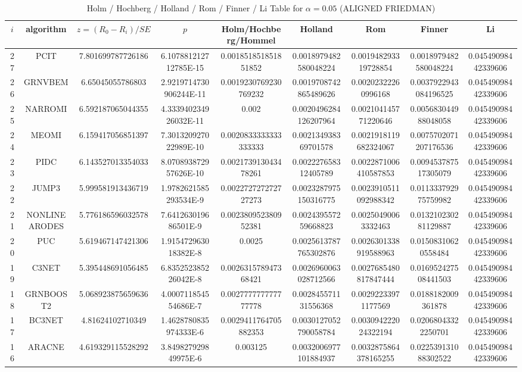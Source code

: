 \documentclass[a4paper,10pt]{article}
\begin{document}
\begin{landscape}
\begin{table}[!htp]
\centering\scriptsize
\caption{Holm / Hochberg / Holland / Rom / Finner / Li Table for $\alpha=0.05$ (ALIGNED FRIEDMAN)}
\begin{tabular}{ccccccccc}
$i$&algorithm&$z=(R_0 - R_i)/SE$&$p$&Holm/Hochberg/Hommel&Holland&Rom&Finner&Li\\
\hline
27&PCIT&7.801699787726186&6.107881212712785E-15&0.001851851851851852&0.0018979482580048224&0.001948293319728854&0.0018979482580048224&0.04549098442339606\\
26&GRNVBEM&6.65045055786803&2.9219714730906244E-11&0.0019230769230769232&0.0019708742865489626&0.00202322260996168&0.0037922943084196525&0.04549098442339606\\
25&NARROMI&6.592187065044355&4.333940234926032E-11&0.002&0.0020496284126207964&0.002104145771220646&0.005683044988048058&0.04549098442339606\\
24&MEOMI&6.159417056851397&7.301320927022989E-10&0.0020833333333333333&0.002134938369701578&0.0021918119682324067&0.0075702071207176536&0.04549098442339606\\
23&PIDC&6.143527013354033&8.070893872957626E-10&0.002173913043478261&0.002227658312405789&0.0022871006410587853&0.009453787517305079&0.04549098442339606\\
22&JUMP3&5.999581913436719&1.9782621585293534E-9&0.002272727272727273&0.0023287975150316775&0.0023910511092988342&0.011333792975759982&0.04549098442339606\\
21&NONLINEARODES&5.776186596032578&7.641263019686501E-9&0.002380952380952381&0.002439557259668823&0.00250490063332463&0.013210230281129887&0.04549098442339606\\
20&PUC&5.619467147421306&1.915472963018382E-8&0.0025&0.0025613787765302876&0.0026301338919588963&0.01508310620558484&0.04549098442339606\\
19&C3NET&5.395448691056485&6.835252385226042E-8&0.002631578947368421&0.0026960063028712566&0.0027685480817847444&0.016952427508441503&0.04549098442339606\\
18&GRNBOOST2&5.068923875659636&4.000711854554686E-7&0.002777777777777778&0.002845571131556368&0.00292233971177569&0.0188182009361878&0.04549098442339606\\
17&BC3NET&4.81624102710349&1.4628780835974333E-6&0.0029411764705882353&0.0030127052790058784&0.003094222024322194&0.02068043322250701&0.04549098442339606\\
16&ARACNE&4.619329115528292&3.849827929849975E-6&0.003125&0.0032006977101884937&0.0032875864378165255&0.022539131088302522&0.04549098442339606\\

\end{tabular}
\end{table}
\end{landscape}
\end{document}
